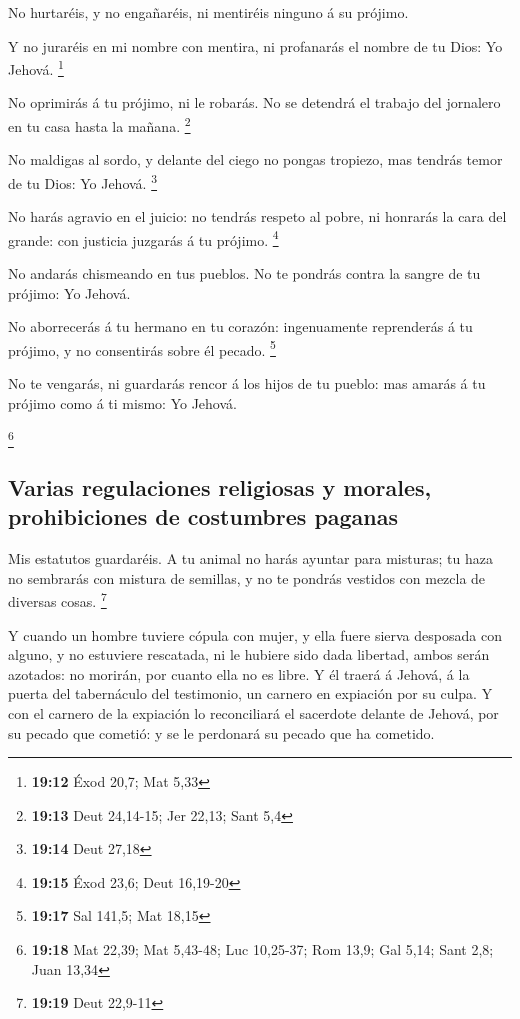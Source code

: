  No hurtaréis, y no engañaréis, ni mentiréis ninguno á su
prójimo.

 Y no juraréis en mi nombre con mentira, ni profanarás el
nombre de tu Dios: Yo Jehová. \footnote{\textbf{19:12} Éxod 20,7; Mat
  5,33}

 No oprimirás á tu prójimo, ni le robarás. No se detendrá
el trabajo del jornalero en tu casa hasta la mañana. \footnote{\textbf{19:13}
  Deut 24,14-15; Jer 22,13; Sant 5,4}

 No maldigas al sordo, y delante del ciego no pongas
tropiezo, mas tendrás temor de tu Dios: Yo Jehová. \footnote{\textbf{19:14}
  Deut 27,18}

 No harás agravio en el juicio: no tendrás respeto al
pobre, ni honrarás la cara del grande: con justicia juzgarás á tu
prójimo. \footnote{\textbf{19:15} Éxod 23,6; Deut 16,19-20}

 No andarás chismeando en tus pueblos. No te pondrás
contra la sangre de tu prójimo: Yo Jehová.

 No aborrecerás á tu hermano en tu corazón: ingenuamente
reprenderás á tu prójimo, y no consentirás sobre él pecado. \footnote{\textbf{19:17}
  Sal 141,5; Mat 18,15}

 No te vengarás, ni guardarás rencor á los hijos de tu
pueblo: mas amarás á tu prójimo como á ti mismo: Yo Jehová.

\footnote{\textbf{19:18} Mat 22,39; Mat 5,43-48; Luc 10,25-37; Rom 13,9;
  Gal 5,14; Sant 2,8; Juan 13,34}

\hypertarget{varias-regulaciones-religiosas-y-morales-prohibiciones-de-costumbres-paganas}{%
\subsection{Varias regulaciones religiosas y morales, prohibiciones de
costumbres
paganas}\label{varias-regulaciones-religiosas-y-morales-prohibiciones-de-costumbres-paganas}}

 Mis estatutos guardaréis. A tu animal no harás ayuntar
para misturas; tu haza no sembrarás con mistura de semillas, y no te
pondrás vestidos con mezcla de diversas cosas. \footnote{\textbf{19:19}
  Deut 22,9-11}

 Y cuando un hombre tuviere cópula con mujer, y ella
fuere sierva desposada con alguno, y no estuviere rescatada, ni le
hubiere sido dada libertad, ambos serán azotados: no morirán, por cuanto
ella no es libre.  Y él traerá á Jehová, á la puerta del
tabernáculo del testimonio, un carnero en expiación por su culpa.
 Y con el carnero de la expiación lo reconciliará el
sacerdote delante de Jehová, por su pecado que cometió: y se le
perdonará su pecado que ha cometido.

